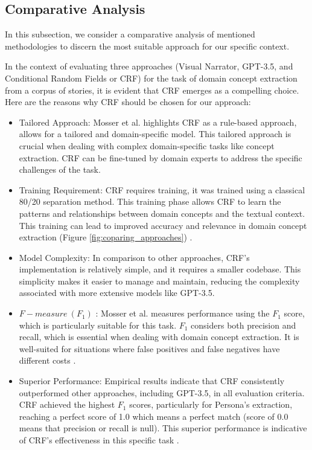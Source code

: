 \subsection{Comparative Analysis} \label{comparative_analysis}
In this subsection, we consider a comparative analysis of mentioned methodologies to discern the most suitable approach for our specific context.

In the context of evaluating three approaches (Visual Narrator, GPT-3.5, and Conditional Random Fields or CRF) for the task of domain concept extraction from a corpus of stories, it is evident that CRF emerges as a compelling choice. Here are the reasons why CRF should be chosen for our approach:
\begin{itemize}
\item Tailored Approach: Mosser et al. highlights CRF as a rule-based approach, allows for a tailored and domain-specific model. This tailored approach is crucial when dealing with complex domain-specific tasks like concept extraction. CRF can be fine-tuned by domain experts to address the specific challenges of the task.
\item Training Requirement: CRF requires training, it was trained using a classical 80/20 separation method. This training phase allows CRF to learn the patterns and relationships between domain concepts and the textual context. This training can lead to improved accuracy and relevance in domain concept extraction (Figure \ref{fig:coparing_approaches}) \cite{arulmohan2023extracting}.
\item Model Complexity: In comparison to other approaches, CRF's implementation is relatively simple, and it requires a smaller codebase. This simplicity makes it easier to manage and maintain, reducing the complexity associated with more extensive models like GPT-3.5.
\item $F-measure\ (F_1)$ : Mosser et al. measures performance using the $F_1$ score, which is particularly suitable for this task. $F_1$ considers both precision and recall, which is essential when dealing with domain concept extraction. It is well-suited for situations where false positives and false negatives have different costs \cite{arulmohan2023extracting}.
\item Superior Performance: Empirical results indicate that CRF consistently outperformed other approaches, including GPT-3.5, in all evaluation criteria. CRF achieved the highest $F_1$ scores, particularly for Persona's extraction, reaching a perfect score of 1.0 which means a perfect match (score of 0.0 means that precision or recall is null). This superior performance is indicative of CRF's effectiveness in this specific task \cite{arulmohan2023extracting}.

\end{itemize}
